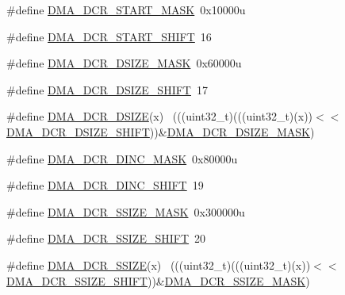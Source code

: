 \begin{DoxyCompactItemize}
\item 
\#define \hyperlink{group___d_m_a___register___masks_gaaaca42eb6474221a4e91f687194fafd6}{D\+M\+A\+\_\+\+D\+C\+R\+\_\+\+S\+T\+A\+R\+T\+\_\+\+M\+A\+SK}~0x10000u
\item 
\#define \hyperlink{group___d_m_a___register___masks_ga86b820fe50e65e5c67d14ba4d3d36c6c}{D\+M\+A\+\_\+\+D\+C\+R\+\_\+\+S\+T\+A\+R\+T\+\_\+\+S\+H\+I\+FT}~16
\item 
\#define \hyperlink{group___d_m_a___register___masks_ga2b7bfbe2aea8f1b41a42795ff78c4fd5}{D\+M\+A\+\_\+\+D\+C\+R\+\_\+\+D\+S\+I\+Z\+E\+\_\+\+M\+A\+SK}~0x60000u
\item 
\#define \hyperlink{group___d_m_a___register___masks_ga6b04b13ff50c5d9247f9a12dd582d511}{D\+M\+A\+\_\+\+D\+C\+R\+\_\+\+D\+S\+I\+Z\+E\+\_\+\+S\+H\+I\+FT}~17
\item 
\#define \hyperlink{group___d_m_a___register___masks_ga8ea97512489369cbc809561e27932a06}{D\+M\+A\+\_\+\+D\+C\+R\+\_\+\+D\+S\+I\+ZE}(x)                                              ~(((uint32\+\_\+t)(((uint32\+\_\+t)(x))$<$$<$\hyperlink{group___d_m_a___register___masks_ga6b04b13ff50c5d9247f9a12dd582d511}{D\+M\+A\+\_\+\+D\+C\+R\+\_\+\+D\+S\+I\+Z\+E\+\_\+\+S\+H\+I\+FT}))\&\hyperlink{group___d_m_a___register___masks_ga2b7bfbe2aea8f1b41a42795ff78c4fd5}{D\+M\+A\+\_\+\+D\+C\+R\+\_\+\+D\+S\+I\+Z\+E\+\_\+\+M\+A\+SK})
\item 
\#define \hyperlink{group___d_m_a___register___masks_gad93bc8cb86ddeb7a40d9cd80011f8ee7}{D\+M\+A\+\_\+\+D\+C\+R\+\_\+\+D\+I\+N\+C\+\_\+\+M\+A\+SK}~0x80000u
\item 
\#define \hyperlink{group___d_m_a___register___masks_ga9a4a7d49cd76a2821e2cf192d3a49fcd}{D\+M\+A\+\_\+\+D\+C\+R\+\_\+\+D\+I\+N\+C\+\_\+\+S\+H\+I\+FT}~19
\item 
\#define \hyperlink{group___d_m_a___register___masks_ga5be9c16cc5eddfdd04e7820f698cd401}{D\+M\+A\+\_\+\+D\+C\+R\+\_\+\+S\+S\+I\+Z\+E\+\_\+\+M\+A\+SK}~0x300000u
\item 
\#define \hyperlink{group___d_m_a___register___masks_ga4229a9ea2db9960308edf51034836083}{D\+M\+A\+\_\+\+D\+C\+R\+\_\+\+S\+S\+I\+Z\+E\+\_\+\+S\+H\+I\+FT}~20
\item 
\#define \hyperlink{group___d_m_a___register___masks_ga0a8797730201cca8a03aae52d0bc40de}{D\+M\+A\+\_\+\+D\+C\+R\+\_\+\+S\+S\+I\+ZE}(x)                                              ~(((uint32\+\_\+t)(((uint32\+\_\+t)(x))$<$$<$\hyperlink{group___d_m_a___register___masks_ga4229a9ea2db9960308edf51034836083}{D\+M\+A\+\_\+\+D\+C\+R\+\_\+\+S\+S\+I\+Z\+E\+\_\+\+S\+H\+I\+FT}))\&\hyperlink{group___d_m_a___register___masks_ga5be9c16cc5eddfdd04e7820f698cd401}{D\+M\+A\+\_\+\+D\+C\+R\+\_\+\+S\+S\+I\+Z\+E\+\_\+\+M\+A\+SK})

\end{DoxyCompactItemize}
